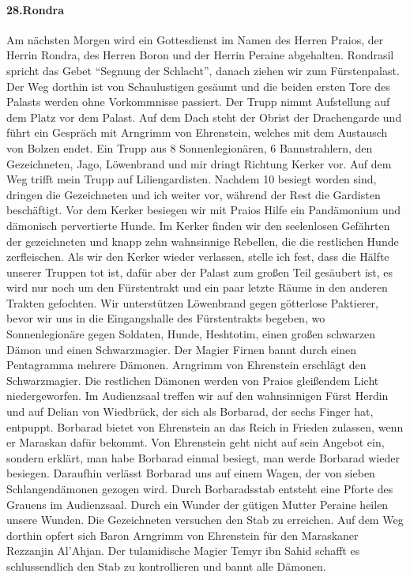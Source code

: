 \paragraph{28.Rondra}
Am nächsten Morgen wird ein Gottesdienst im Namen des Herren Praios, der Herrin Rondra, des Herren Boron und der Herrin Peraine abgehalten. Rondrasil spricht das Gebet ``Segnung der Schlacht'', danach ziehen wir zum Fürstenpalast. Der Weg dorthin ist von Schaulustigen gesäumt und die beiden ersten Tore des Palasts werden ohne Vorkommnisse passiert. Der Trupp nimmt Aufstellung auf dem Platz vor dem Palast. Auf dem Dach steht der Obrist der Drachengarde und führt ein Gespräch mit Arngrimm von Ehrenstein, welches mit dem Austausch von Bolzen endet. Ein Trupp aus 8 Sonnenlegionären, 6 Bannstrahlern, den Gezeichneten, Jago, Löwenbrand und mir dringt Richtung Kerker vor. Auf dem Weg trifft mein Trupp auf Liliengardisten. Nachdem 10 besiegt worden sind, dringen die Gezeichneten und ich weiter vor, während der Rest die Gardisten beschäftigt. Vor dem Kerker besiegen wir mit Praios Hilfe ein Pandämonium und dämonisch pervertierte Hunde. Im Kerker finden wir den seelenlosen Gefährten der gezeichneten und knapp zehn wahnsinnige Rebellen, die die restlichen Hunde zerfleischen. Als wir den Kerker wieder verlassen, stelle ich fest, dass die Hälfte unserer Truppen tot ist, dafür aber der Palast zum großen Teil gesäubert ist, es wird nur noch um den Fürstentrakt und ein paar letzte Räume in den anderen Trakten gefochten. Wir unterstützen Löwenbrand gegen götterlose Paktierer, bevor wir uns in die Eingangshalle des Fürstentrakts begeben, wo Sonnenlegionäre gegen Soldaten, Hunde, Heshtotim, einen großen schwarzen Dämon und einen Schwarzmagier. Der Magier Firnen bannt durch einen Pentagramma mehrere Dämonen. Arngrimm von Ehrenstein erschlägt den Schwarzmagier. Die restlichen Dämonen werden von Praios gleißendem Licht niedergeworfen. Im Audienzsaal treffen wir auf den wahnsinnigen Fürst Herdin und auf Delian von Wiedbrück, der sich als Borbarad, der sechs Finger hat, entpuppt. Borbarad bietet von Ehrenstein an das Reich in Frieden zulassen, wenn er Maraskan dafür bekommt. Von Ehrenstein geht nicht auf sein Angebot ein, sondern erklärt, man habe Borbarad einmal besiegt, man werde Borbarad wieder besiegen. Daraufhin verlässt Borbarad uns auf einem Wagen, der von sieben Schlangendämonen gezogen wird. Durch Borbaradsstab entsteht eine Pforte des Grauens im Audienzsaal. Durch ein Wunder der gütigen Mutter Peraine heilen unsere Wunden. Die Gezeichneten versuchen den Stab zu erreichen. Auf dem Weg dorthin opfert sich Baron Arngrimm von Ehrenstein für den Maraskaner Rezzanjin Al'Ahjan. Der tulamidische Magier Temyr ibn Sahid schafft es schlussendlich den Stab zu kontrollieren und bannt alle Dämonen.

